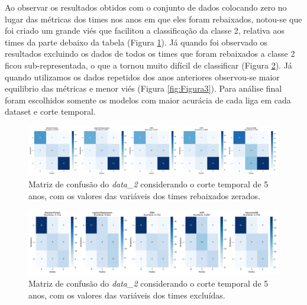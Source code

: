 \documentclass[a4paper]{article}
\theoremstyle{plain}
\theoremstyle{definition}
\begin{document}
Ao observar os resultados obtidos com o conjunto de dados colocando zero no lugar das métricas dos times nos anos em que eles foram rebaixados, notou-se que foi criado um grande viés que facilitou a classificação da classe 2, relativa aos times da parte debaixo da tabela (Figura \ref{fig:Figura1}). Já quando foi observado os resultados excluindo os dados de todos os times que foram rebaixados a classe 2 ficou sub-representada, o que a tornou muito difícil de classificar (Figura \ref{fig:Figura2}). Já quando utilizamos os dados repetidos dos anos anteriores observou-se maior equilibrio das métricas e menor viés (Figura \ref{fig:Figura3}). Para análise final foram escolhidos somente os modelos com maior acurácia de cada liga em cada dataset e corte temporal.


\begin{figure}[H]
    \centering
    \includegraphics[width=1\textwidth]{Figures/data_2_5years_premier_league_matriz_confusao_Zero.png}
    \caption{Matriz de confusão do \textit{data\_2} considerando o corte temporal de 5 anos, com os valores das variáveis dos times rebaixados zerados.}
    \label{fig:Figura1}
\end{figure}

\begin{figure}[H]
    \centering
    \includegraphics[width=1\textwidth]{Figures/data_2_5years_premier_league_matriz_confusao_exclusao.png}
    \caption{Matriz de confusão do \textit{data\_2} considerando o corte temporal de 5 anos, com os valores das variáveis dos times excluídas.}
    \label{fig:Figura2}
\end{figure}
\end{document}

